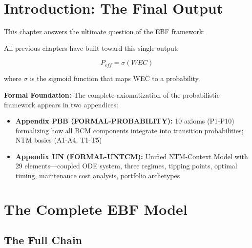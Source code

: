 \section{Introduction: The Final Output}\label{sec:ch16-intro}

This chapter answers the ultimate question of the EBF framework:

\begin{center}
\end{center}

All previous chapters have built toward this single output:

\begin{equation}
\boxed{P_{eff} = \sigma(WEC)}
\end{equation}

where $\sigma$ is the sigmoid function that maps WEC to a probability.

\textbf{Formal Foundation:} The complete axiomatization of the probabilistic framework appears in two appendices:
\begin{itemize}[nosep]
\item \textbf{Appendix PBB (FORMAL-PROBABILITY):} 10 axioms (P1-P10) formalizing how all BCM components integrate into transition probabilities; NTM basics (A1-A4, T1-T5)
\item \textbf{Appendix UN (FORMAL-UNTCM):} Unified NTM-Context Model with 29 elements---coupled ODE system, three regimes, tipping points, optimal timing, maintenance cost analysis, portfolio archetypes
\end{itemize}

\section{The Complete EBF Model}\label{sec:ch16-model}

\subsection{The Full Chain}


